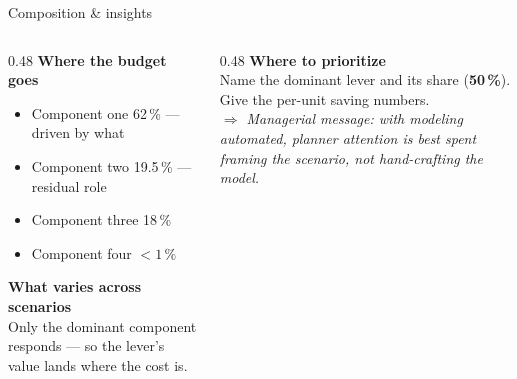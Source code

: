 \documentclass[aspectratio=169,11pt]{beamer}   %
\begin{document}
\begin{frame}{Composition \& insights}
\small
\begin{columns}[T]
\begin{column}{0.48\textwidth}
\textcolor{secondary}{\bfseries Where the budget goes}
\begin{itemize}\setlength\itemsep{0.8mm}\footnotesize
\item Component one \alert{62\,\%} --- driven by what
\item Component two \alert{19.5\,\%} --- residual role
\item Component three \alert{18\,\%}
\item Component four \alert{$<1\,\%$}
\end{itemize}
\textcolor{secondary}{\bfseries What varies across scenarios}\\
\footnotesize Only the dominant component responds --- so the lever's value lands where the cost is.
\end{column}
\begin{column}{0.48\textwidth}
\textcolor{accent}{\bfseries Where to prioritize}\\[1.5mm]
\footnotesize Name the dominant lever and its share (\textbf{50\,\%}).\\[1.5mm]
Give the per-unit saving numbers.\\[1.5mm]
\itshape $\Rightarrow$ Managerial message: with modeling automated, planner attention is best spent framing the scenario, not hand-crafting the model.
\end{column}
\end{columns}
\end{frame}
\end{document}
